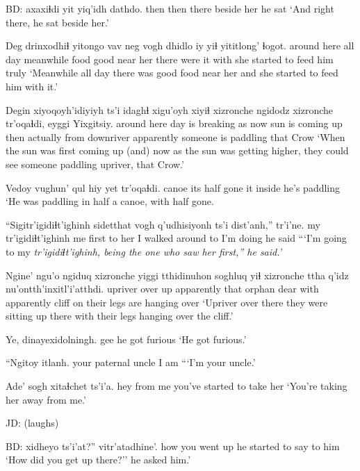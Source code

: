 \documentclass[12pt]{article}
\begin{document}
BD:  
 axaxiɬdi yit   yiq'idh    dathdo.
then           then   there {beside her} {he sat}
\glt `And right there, he sat beside her.'
\glend

\gll Deg         drinxodhiɬ yitongo   vav  neg  vogh dhidlo        iy yiɬ  yititlong'             ɬogot.
{around here} {all day}  meanwhile food good {near her} {there were} it with {she started to feed him} truly
\glt `Meanwhile all day there was good food near her and she started to feed him with it.'
\glend

\gll Degin {xiyoqoyh'idiyiyh} ts'i idaghɬ xigu'oyh xiyiɬ xizronche ngidodz        xizronche  tr'oqaɬdi, eyggi Yixgitsiy.
{around here}  {day is breaking}    as     now    {sun is coming up} then actually {from downriver} apparently {someone is paddling} that  Crow
\glt `When the sun was first coming up (and) now as the sun was getting higher, they could see someone paddling upriver, that Crow.'
\glend

\gll Vedoy vughun'  qul  hiy yet    tr'oqaɬdi.
canoe {its half} gone it  inside {he's paddling}
\glt `He was paddling in half a canoe, with half gone. 
\glend

\gll ``Sigitr'igidiɬt'ighinh sidetthat vogh   q'udhisiyonh    ts'i dist'anh,''  tr'i'ne.
{my tr'igidiɬt'ighinh} {me first} {to her} {I walked around to} {}  {I'm doing} {he said}
\glt ```I'm going to my \em tr'igidiɬt'ighinh, \em being the one who saw her first,'' he said.'
\glend

\gll Ngine'  ngu'o ngiduq xizronche  yiggi tthidinuhon soghluq yiɬ  xizronche  ttha q'idz nu'ontth'inxitl'i'atthdi.
upriver over    up     apparently that  orphan      dear    with apparently cliff on   {their legs are hanging over}
\glt `Upriver over there they were sitting up there with their legs hanging over the cliff.'
\glend

\gll Ye, dinayexidolningh.
gee {he got furious}
\glt `He got furious.'
\glend

\gll ``Ngitoy     itlanh.
{your paternal uncle} {I am}
\glt ```I'm your uncle.'
\glend

\gll Ade' sogh    xitaɬchet         {ts'i'a.}
hey  {from me} {you've started to take her}
\glt `You're taking her away from me.'
\glend

JD:  (laughs)

BD:  
 xidheyo     {ts'i'at?''} vitr'atadhine'.
how          {you went up} {}      {he started to say to him}     
\glt `How did you get up there?'' he asked him.'
\glend
\end{document}
